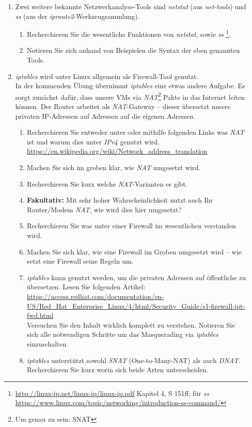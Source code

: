 \documentclass[paper=a4,fontsize=11pt]{scrartcl}%
\numberwithin{equation}{section}
\begin{document}
\begin{enumerate}
\begin{enumerate}
\begin{enumerate}
	\end{enumerate}
	\item Zwei weitere bekannte Netzwerkanalyse-Tools sind \emph{netstat} (aus \emph{net-tools}) und \emph{ss} (aus der \emph{iproute2}-Werkzeugsammlung).
	\begin{enumerate}
		\item Recherchieren Sie die wesentliche Funktionen von \emph{netstat}, sowie \emph{ss} \footnote{\url{http://linux-ip.net/linux-ip/linux-ip.pdf} Kapitel 4, S 151ff; für \emph{ss} \url{https://www.linux.com/topic/networking/introduction-ss-command/}}.
		\item Notieren Sie sich anhand von Beispielen die Syntax der eben genannten Tools. 
	\end{enumerate}
	\item \emph{iptables} wird unter Linux allgemein als Firewall-Tool genutzt.\\
	In der kommenden Übung übernimmt \emph{iptables} eine etwas andere Aufgabe. Es sorgt zunächst dafür, dass unsere VMs via \emph{NAT}\footnote{Um genau zu sein: SNAT} Pakte in das Internet leiten können. Der Router arbeitet als \emph{NAT}-Gateway -- dieser übersetzt unsere privaten IP-Adressen auf Adressen auf die eigenen Adressen. 
	\begin{enumerate}
		\item Recherchieren Sie entweder unter \cite[S. 349f]{Kurose2012} oder mithilfe folgenden Links was \emph{NAT} ist und warum dies unter \emph{IPv4} genutzt wird.\\
		\url{https://en.wikipedia.org/wiki/Network_address_translation}
		\item Machen Sie sich im groben klar, wie \emph{NAT} umgesetzt wird.
		\item Recherchieren Sie kurz welche \emph{NAT}-Varianten es gibt. 
		\item \textbf{Fakultativ:} Mit sehr hoher Wahrscheinlichkeit nutzt auch Ihr Router/Modem \emph{NAT}, wie wird dies hier umgesetzt?
		\item Recherchieren Sie was unter einer Firewall im wesentlichen verstanden wird.
		\item Machen Sie sich klar, wie eine Firewall im Groben umgesetzt wird -- wie setzt eine Firewall seine Regeln um.
		\item \emph{iptables} kann genutzt werden, um die privaten Adressen auf öffentliche zu übersetzen. Lesen Sie folgenden Artikel:\\
		\url{https://access.redhat.com/documentation/en-US/Red_Hat_Enterprise_Linux/4/html/Security_Guide/s1-firewall-ipt-fwd.html}\\
		Versuchen Sie den Inhalt wirklich komplett zu verstehen. Notieren Sie sich alle notwendigen Schritte um das Masquerading via \emph{iptables} einzuschalten.
		\item \emph{iptables} unterstützt sowohl \emph{SNAT} (One-to-Many-NAT) als auch \emph{DNAT}. Recherchieren Sie kurz worin sich beide Arten unterscheiden.
	\end{enumerate}
	\end{enumerate}
\end{enumerate}
\end{document}
